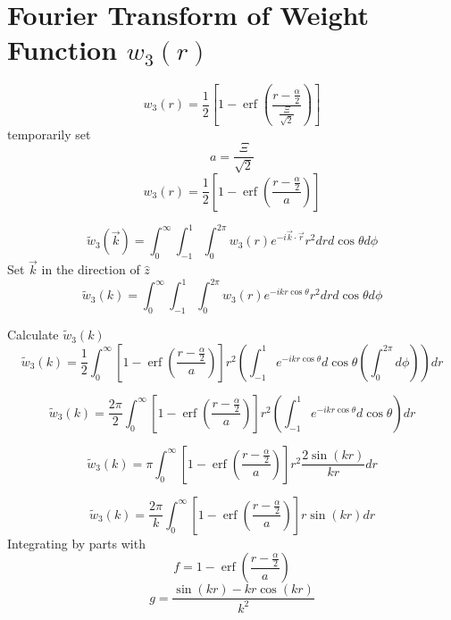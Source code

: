 \documentclass[double,12pt]{beavtex}
\begin{document}
\section{Fourier Transform of Weight Function $w_{3}(r)$}
\begin{equation}{w_3(r)=\frac{1}{2}\left[1-\operatorname{erf}\left(\frac{r-\frac{\alpha}{2}}{\frac{\Xi}{\sqrt{2}}}\right)\right]}\end{equation}
temporarily set 
\begin{equation}{a=\frac{\Xi}{\sqrt{2}}}\end{equation}
\begin{equation}{w_3(r)=\frac{1}{2}\left[1-\operatorname{erf}\left(\frac{r-\frac{\alpha}{2}}{a}\right)\right]}\end{equation}

\begin{equation}{\widetilde{w}_3(\vec{k})=\int_{0}^{\infty}\int_{-1}^{1}\int_{0}^{2\pi}w_3(r)e^{-i\vec{k}\cdot{\vec{r}}}r^2d{r}d{\cos\theta}d{\phi}}\end{equation}
Set $\vec{k}$ in the direction of $\hat{z}$ 
\begin{equation}{\widetilde{w}_3(k)=\int_{0}^{\infty}\int_{-1}^{1}\int_{0}^{2\pi}w_3(r)e^{-ikr\cos\theta}r^2d{r}d{\cos\theta}d{\phi}}\end{equation}

\noindent Calculate $\widetilde{w}_3(k)$ 
\begin{equation}{\widetilde{w}_3(k)=\frac{1}{2}\int_{0}^{\infty}\left[1-\operatorname{erf}\left(\frac{r-\frac{\alpha}{2}}{a}\right)\right]r^2\left(\int_{-1}^{1}e^{-ikr\cos\theta}d{\cos\theta}\left(\int_{0}^{2\pi}d{\phi}\right)\right)d{r}}\end{equation}

\begin{equation}{\widetilde{w}_3(k)=\frac{2\pi}{2}\int_{0}^{\infty}\left[1-\operatorname{erf}\left(\frac{r-\frac{\alpha}{2}}{a}\right)\right]r^2\left(\int_{-1}^{1}e^{-ikr\cos\theta}d{\cos\theta}\right)d{r}}\end{equation}

\begin{equation}{\widetilde{w}_3(k)=\pi\int_{0}^{\infty}\left[1-\operatorname{erf}\left(\frac{r-\frac{\alpha}{2}}{a}\right)\right]r^2\frac{2\sin(kr)}{kr}d{r}}\end{equation}

\begin{equation}{\widetilde{w}_3(k)=\frac{2\pi}{k}\int_{0}^{\infty}\left[1-\operatorname{erf}\left(\frac{r-\frac{\alpha}{2}}{a}\right)\right]r\sin(kr)d{r}}\end{equation}
Integrating by parts with 
\begin{displaymath}{f=1-\operatorname{erf}\left(\frac{r-\frac{\alpha}{2}}{a}\right)}\end{displaymath}
\begin{displaymath}{g=\frac{\sin(kr)-kr\cos(kr)}{k^2}}\end{displaymath}
\end{document}

